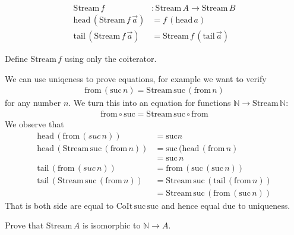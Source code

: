 \documentclass{article}
\newcommand{\Nat}{\mathbb{N}}
\newcommand{\suc}{\mathrm{suc}}
\newcommand{\Stream}{\mathrm{Stream}}
\newcommand{\head}{\mathrm{head}}
\newcommand{\tail}{\mathrm{tail}}
\newcommand{\CoIt}{\mathrm{CoIt}}
\newcommand{\from}{\mathrm{from}}
\begin{document}
\begin{align*}
\Stream\,f & : \Stream\,A \to \Stream\,B \\
\head\,(\Stream\,f\,\vec{a}) & = f\,(\head\,a) \\
\tail\,(\Stream\,f\,\vec{a}) & = \Stream\,f\,(\tail\,\vec{a})
\end{align*}
\begin{Exercise}
  Define $\Stream\,f$ using only the coiterator.
\end{Exercise}

We can use uniqeness to prove equations, for example we want to verify
\begin{align*}
\from\,(\suc\,n) = \Stream\,\suc\,(\from\,n)
\end{align*}
for any number $n$. We turn this into an equation for functions $\Nat \to \Stream\,\Nat$:
\begin{align*}
  \from \circ \suc = \Stream\,\suc \circ \from
\end{align*}
We observe that 
\begin{align*}
  \head\,(\from\,(suc\,n)) & = \suc n\\
  \head\,(\Stream\,\suc\,(\from\,n)) & = \suc\,(\head\,(\from\,n) \\
  & = \suc\,n\\
  \tail\, (\from\,(suc\,n)) & = \from\,(\suc\,(\suc\,n))\\
  \tail\, (\Stream\,\suc\,(\from\,n)) & = \Stream\,\suc\,(\tail\,(\from\,n))\\
                                        & = \Stream\,\suc\,(\from\,(\suc\,n))
\end{align*}
That is both side are equal to $\CoIt\,\suc\,\suc$ and hence equal due to uniqueness. 

\begin{Exercise}
  Prove that $\Stream\,A$ is isomorphic to $\Nat \to A$.
\end{Exercise}
\end{document}
